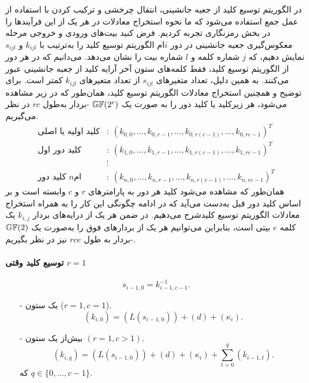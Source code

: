 در الگوریتم توسیع کلید از جعبه جانشینی، انتقال چرخشی و ترکیب کردن با استفاده از عمل جمع استفاده می‌شود که ما نحوه استخراج معادلات در هر یک از این فرآیندها را در بخش رمزنگاری تجربه کردیم. فرض کنید بیت‌های ورودی و خروجی مرحله معکوس‌گیری جعبه جانشینی در دور 
$i$ام 
 الگوریتم توسیع کلید را به‌ترتیب با 
$k_{ijl}$
و 
$s_{ijl}$
نمایش دهیم، که 
$j$
شماره کلمه و 
$l$
شماره بیت را نشان می‌دهد. می‌دانیم که در هر دور از الگوریتم توسیع کلید، فقط  کلمه‌های  ستون آخر  آرایه کلید از جعبه جانشینی عبور می‌کنند. به همین دلیل، تعداد متغیرهای 
$s_{ijl}$
از تعداد متغیرهای
$k_{ijl}$
کمتر است. برای توضیح و همچنین استخراج معادلات الگوریتم توسیع کلید،  همان‌طور که در زیر مشاهده می‌شود، هر زیرکلید یا کلید دور را به صورت یک 
$\mathbb{GF}(2^{e})$
-بردار به‌طول 
$rc$
در نظر می‌گیریم. 
\begin{align*}
\text{کلید اولیه یا اصلی}
&: \ (k_{0,0},\ldots,k_{0,r-1},\ldots,k_{0,r(c-1)},\ldots,k_{0,rc-1})^{T}\\
\text{کلید دور اول}
&: \ (k_{1,0},\ldots,k_{1,r-1},\ldots,k_{1,r(c-1)},\ldots,k_{1,rc-1})^{T}
\\
&\vdots
\\
\text{کلید دور 
	$n$ام}
&: \ (k_{n,0},\ldots,k_{n,r-1},\ldots,k_{n,r(c-1)},\ldots,k_{n,rc-1})^{T}
\end{align*}
همان‌طور که مشاهده می‌شود کلید هر دور به پارامترهای 
$r$
و
$c$
وابسته است و بر اساس کلید دور قبل به‌دست می‌آید که در ادامه چگونگی این کار را به همراه استخراج معادلات الگوریتم توسیع کلیدشرح می‌دهیم. در ضمن هر یک از درایه‌های بردار 
$k_{i,j}$
یک کلمه 
$e$
بیتی است، بنابراین می‌توانیم هر یک از بردارهای فوق را به‌صورت یک 
$\mathbb{GF}(2)$
-بردار به طول 
$rce$
نیز در نظر بگیریم. 
\paragraph*{توسیع کلید  وقتی 
	$r = 1$}
$$s_{i-1,0} = k_{i-1,c-1}^{-1}.$$
\begin{itemize}
	\item[-]
	یک ستون 
	($r = 1, c = 1$).
	$$(k_{i,0}) = (L(s_{i-1,0})) + (d) + (\kappa_{i}).$$
	\item[-]
	بیش‌از یک ستون
	$(r = 1, c >‌ 1)$.
	$$(k_{i,q}) = (L(s_{i-1,0})) + (d) +‌(\kappa_{i}) + \sum_{t =0}^{q}(k_{i-1,t}).$$
	که 
	$q\in \{0,...,c-1\}$.
\end{itemize}
